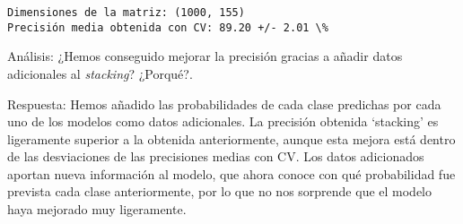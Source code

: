 \documentclass[11pt]{article}
\begin{document}
    \begin{Verbatim}[commandchars=\\\{\}]
Dimensiones de la matriz: (1000, 155)
Precisión media obtenida con CV: 89.20 +/- 2.01 \%

    \end{Verbatim}

    Análisis: ¿Hemos conseguido mejorar la precisión gracias a añadir datos
adicionales al \emph{stacking}? ¿Porqué?.

    Respuesta: Hemos añadido las probabilidades de cada clase predichas por
cada uno de los modelos como datos adicionales. La precisión obtenida
`stacking' es ligeramente superior a la obtenida anteriormente, aunque
esta mejora está dentro de las desviaciones de las precisiones medias
con CV. Los datos adicionados aportan nueva información al modelo, que
ahora conoce con qué probabilidad fue prevista cada clase anteriormente,
por lo que no nos sorprende que el modelo haya mejorado muy ligeramente.


    
    
    
    
\end{document}
